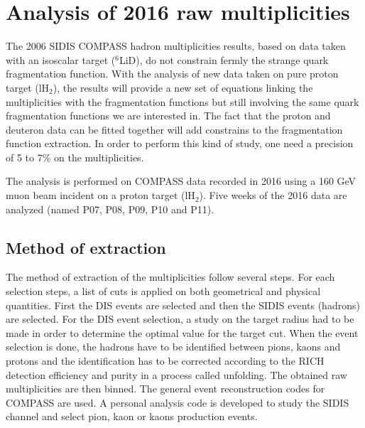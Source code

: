 
\chapter{Analysis of 2016 raw multiplicities} %

\label{ch:raw} %

The 2006 SIDIS COMPASS hadron multiplicities results, based on data taken with an isoscalar target ($^6$LiD), do not constrain fermly the strange quark fragmentation function.
With the analysis of new data taken on pure proton target (lH$_2$), the results will provide a new set of equations linking the multiplicities with the fragmentation functions but still involving the same quark fragmentation functions we are interested in. The fact that the proton and deuteron data can be fitted together will add constrains to the fragmentation function extraction.
In order to perform this kind of study, one need a precision of 5 to 7\% on the multiplicities.

The analysis is performed on COMPASS data recorded in 2016 using a 160 GeV muon beam incident on a proton target (lH$_2$). Five weeks of the 2016 data are analyzed (named P07, P08, P09, P10 and P11).


\section{Method of extraction}

The method of extraction of the multiplicities follow several steps. For each selection steps,
a list of cuts is applied on both geometrical and physical quantities. First the DIS events are selected
and then the SIDIS events (hadrons) are selected. For the DIS event selection, a study on the target radius had to be made in order to determine the optimal value for the target cut. When the event selection is done, the hadrons have to be identified between pions, kaons and protons and the identification has to be corrected according to the RICH detection efficiency and purity in a process called unfolding. The obtained raw multiplicities are then binned. The general event reconstruction codes for COMPASS are used. A personal analysis code is developed to study the SIDIS channel and select pion, kaon or kaons production events.

